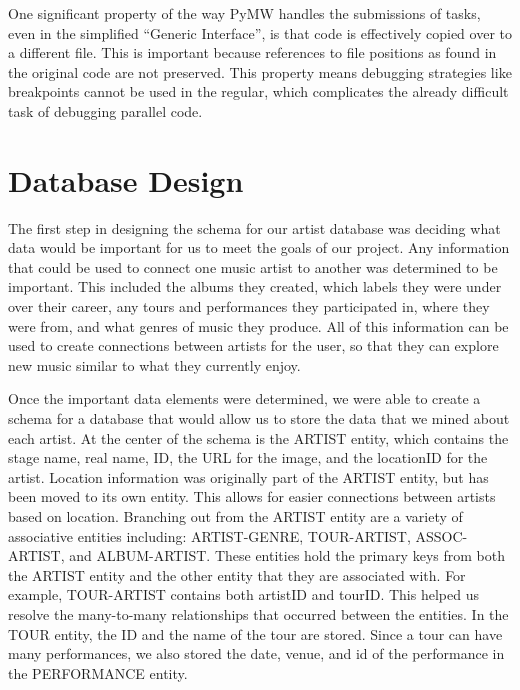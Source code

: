 \documentclass{sig-alternate}
\begin{document}
One significant property of the way PyMW handles the submissions of tasks, even in the simplified ``Generic Interface'',
is that code is effectively copied over to a different file. This is important because references to file positions as
found in the original code are not preserved. This property means debugging strategies like breakpoints cannot be used
in the regular, which complicates the already difficult task of debugging parallel code.

\section{Database Design}
\label{db design}

The first step in designing the schema for our artist database was deciding what data would be important
for us to meet the goals of our project. Any information that could be used to connect one music artist 
to another was determined to be important. This included the albums they created, which labels they were 
under over their career, any tours and performances they participated in, where they were from, and what 
genres of music they produce. All of this information can be used to create connections between artists for 
the user, so that they can explore new music similar to what they currently enjoy.

Once the important data elements were determined, we were able to create a schema for a database that would 
allow us to store the data that we mined about each artist. At the center of the schema is the ARTIST entity, 
which contains the stage name, real name, ID, the URL for the image, and the locationID for the artist. Location 
information was originally part of the ARTIST entity, but has been moved to its own entity. This allows for easier 
connections between artists based on location. Branching out from the ARTIST entity are a variety of associative 
entities including: ARTIST-GENRE, TOUR-ARTIST, ASSOC-ARTIST, and ALBUM-ARTIST. These entities hold the primary 
keys from both the ARTIST entity and the other entity that they are associated with. For example, TOUR-ARTIST 
contains both artistID and tourID. This helped us resolve the many-to-many relationships that occurred between 
the entities. In the TOUR entity, the ID and the name of the tour are stored. Since a tour can have many performances, 
we also stored the date, venue, and id of the performance in the PERFORMANCE entity.
\end{document}
